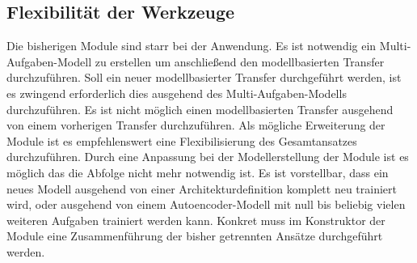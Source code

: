 	\subsection{Flexibilität der Werkzeuge}
	\label{subsec:FlexibilitätDerWerkzeuge}
	Die bisherigen Module sind starr bei der Anwendung. Es ist notwendig ein Multi-Aufgaben-Modell zu erstellen um anschließend den modellbasierten Transfer durchzuführen. Soll ein neuer modellbasierter Transfer durchgeführt werden, ist es zwingend erforderlich dies ausgehend des Multi-Aufgaben-Modells durchzuführen. Es ist  nicht möglich einen modellbasierten Transfer ausgehend von einem vorherigen Transfer durchzuführen. 
	Als mögliche Erweiterung der Module ist es empfehlenswert eine Flexibilisierung des Gesamtansatzes durchzuführen. Durch eine Anpassung bei der Modellerstellung der Module ist es möglich das die Abfolge nicht mehr notwendig ist. Es ist vorstellbar, dass ein neues Modell ausgehend von einer Architekturdefinition komplett neu trainiert wird, oder ausgehend von einem Autoencoder-Modell mit null bis beliebig vielen weiteren Aufgaben trainiert werden kann. Konkret muss im Konstruktor der Module eine Zusammenführung der bisher getrennten Ansätze durchgeführt werden.     
